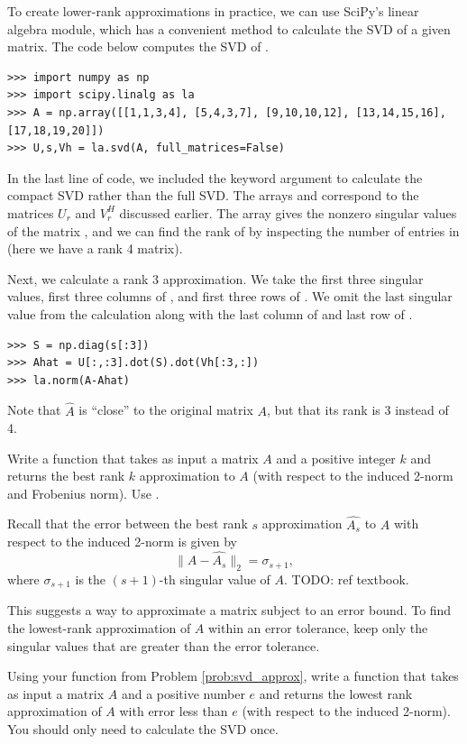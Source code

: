 To create lower-rank approximations in practice, we can use SciPy's linear algebra module, which has a convenient method to calculate the SVD of a given matrix. 
The code below computes the SVD of .
\begin{lstlisting}
>>> import numpy as np
>>> import scipy.linalg as la
>>> A = np.array([[1,1,3,4], [5,4,3,7], [9,10,10,12], [13,14,15,16], [17,18,19,20]])
>>> U,s,Vh = la.svd(A, full_matrices=False)
\end{lstlisting}
In the last line of code, we included the keyword argument  to calculate the
compact SVD rather than the full SVD. The arrays  and  correspond to the matrices
$U_r$ and $V_r^H$ discussed earlier. The array  gives the nonzero singular values
of the matrix , and we can find the rank of  by inspecting the number of entries in  (here we have a rank 4 matrix). 

Next, we calculate a rank 3 approximation.
We take the first three singular values, first three columns of , and first three rows of .
We omit the last singular value from the calculation along with the last column of  and last row of .

\begin{lstlisting}
>>> S = np.diag(s[:3])
>>> Ahat = U[:,:3].dot(S).dot(Vh[:3,:])
>>> la.norm(A-Ahat)
\end{lstlisting}
Note that $\widehat A$ is ``close'' to the original matrix $A$, but that its rank is 3 instead of 4. 

\begin{problem}
Write a function  that takes as input a matrix $A$ and a positive integer $k$ and returns 
the best rank $k$ approximation to $A$ (with respect to the induced 2-norm and Frobenius norm).
Use .
\label{prob:svd_approx}
\end{problem}

Recall that the error between the best rank $s$ approximation $\widehat{A_s}$ to $A$ with respect to the induced 
2-norm is given by
$$
\|A - \widehat{A_s}\|_2 = \sigma_{s+1},
$$
where $\sigma_{s+1}$ is the $(s+1)$-th singular value of $A$. 
TODO: ref textbook.

This suggests a way to approximate a matrix subject to an error bound. 
To find the lowest-rank approximation of $A$ within an error tolerance, keep only the singular values that are greater than the error tolerance.

\begin{problem}
Using your  function from Problem \ref{prob:svd_approx}, write a function  that takes as input a matrix $A$ and a positive number $e$ and returns
the lowest rank approximation of $A$ with error less than $e$ (with respect to the induced 2-norm).
You should only need to calculate the SVD once.
\end{problem}


